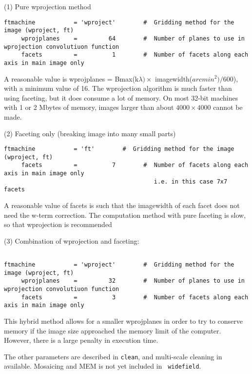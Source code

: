 \documentclass[11pt]{report}
\begin{document}
(1) Pure wprojection method

\scriptsize
\begin{verbatim}
ftmachine           = 'wproject'        #  Gridding method for the image (wproject, ft)
     wprojplanes    =         64        #  Number of planes to use in wprojection convolutiuon function
     facets         =          1        #  Number of facets along each axis in main image only
\end{verbatim}

\noindent A reasonable value is wprojplanes = Bmax(k$\lambda)\times$
imagewidth($arcmin^2) / 600$), with a minimum value of 16.  The
wprojection algorithm is much faster than using faceting, but it does
consume a lot of memory.  On most 32-bit machines with 1 or 2 Mbytes
of memory, images larger than about $4000\times 4000$ cannot be made.

(2) Faceting only (breaking image into many small parts)

\scriptsize
\begin{verbatim}
ftmachine           = 'ft'        #  Gridding method for the image (wproject, ft)
     facets         =          7        #  Number of facets along each axis in main image only
                                           i.e. in this case 7x7 facets
\end{verbatim}
\normalsize

\noindent A reasonable value of facets is such that the imagewidth of each facet does not need
the w-term correction.  The computation method with pure faceting is slow, so that wprojection
is recommended


(3) Combination of wprojection and faceting:

\scriptsize
\begin{verbatim}

ftmachine           = 'wproject'        #  Gridding method for the image (wproject, ft)
     wprojplanes    =         32        #  Number of planes to use in wprojection convolutiuon function
     facets         =          3        #  Number of facets along each axis in main image only

\end{verbatim}
\normalsize

\noindent This hybrid method allows for a smaller wprojplanes in order
to try to conserve memory if the image size approached the memory limit
of the computer.  However, there is a large penalty in execution time.

The other parameters are described in {\tt clean}, and multi-scale
cleaning in available.  Mosaicing and MEM is not yet included in {\tt
widefield}.



\end{document}
